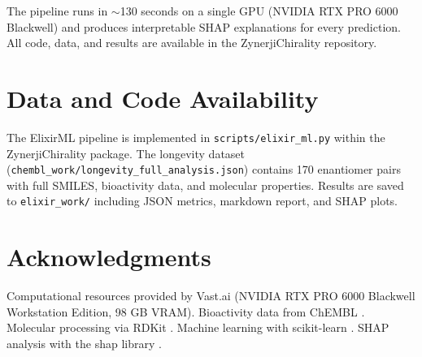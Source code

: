 \documentclass[11pt,a4paper]{article}
\begin{document}
\noindent The pipeline runs in ${\sim}$130 seconds on a single GPU
(NVIDIA RTX PRO 6000 Blackwell) and produces interpretable SHAP
explanations for every prediction. All code, data, and results are
available in the ZynerjiChirality repository.

\section*{Data and Code Availability}

The ElixirML pipeline is implemented in \texttt{scripts/elixir\_ml.py}
within the ZynerjiChirality package. The longevity dataset
(\texttt{chembl\_work/longevity\_full\_analysis.json}) contains 170
enantiomer pairs with full SMILES, bioactivity data, and molecular
properties. Results are saved to \texttt{elixir\_work/} including
JSON metrics, markdown report, and SHAP plots.

\section*{Acknowledgments}

Computational resources provided by Vast.ai (NVIDIA RTX PRO 6000
Blackwell Workstation Edition, 98 GB VRAM). Bioactivity data from
ChEMBL \cite{mendez2019}. Molecular processing via RDKit \cite{rdkit}.
Machine learning with scikit-learn \cite{pedregosa2011}. SHAP analysis
with the shap library \cite{lundberg2017}.
\end{document}
